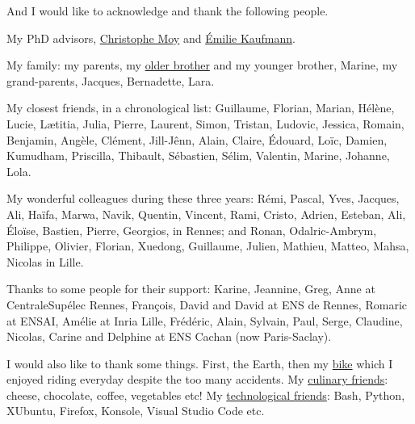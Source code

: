 
\begin{acknowledgements}


And I would like to acknowledge and thank the following people.

My PhD advisors, \href{https://moychristophe.wordpress.com/}{Christophe Moy} and \href{http://chercheurs.lille.inria.fr/ekaufman/research.html}{Émilie Kaufmann}.

My family: my parents, my \href{https://paris-sorbonne.academia.edu/FBesson}{older brother} and my younger brother, Marine, my grand-parents, Jacques, Bernadette, Lara.

My closest friends, in a chronological list: Guillaume, Florian, Marian, Hélène, Lucie, Lætitia, Julia, Pierre, Laurent, Simon, Tristan, Ludovic, Jessica, Romain, Benjamin, Angèle, Clément, Jill-Jênn, Alain, Claire, Édouard, Loïc, Damien, Kumudham, Priscilla, Thibault, Sébastien, Sélim, Valentin, Marine, Johanne, Lola.

My wonderful colleagues during these three years: Rémi, Pascal, Yves, Jacques, Ali, Haïfa, Marwa, Navik, Quentin, Vincent, Rami, Cristo, Adrien, Esteban, Ali, Éloïse, Bastien, Pierre, Georgios, in Rennes; and Ronan, Odalric-Ambrym, Philippe, Olivier, Florian, Xuedong, Guillaume, Julien, Mathieu, Matteo, Mahsa, Nicolas in Lille.

Thanks to some people for their support: Karine, Jeannine, Greg, Anne at CentraleSupélec Rennes, François, David and David at ENS de Rennes, Romaric at ENSAI, Amélie at Inria Lille, Frédéric, Alain, Sylvain, Paul, Serge, Claudine, Nicolas, Carine and Delphine at ENS Cachan (now Paris-Saclay).


I would also like to thank some things. First, the Earth, then my \href{https://perso.crans.org/besson/zero-dechet/}{bike} which I enjoyed riding everyday despite the too many accidents.
My \href{https://perso.crans.org/besson/cuisine/}{culinary friends}: cheese, chocolate, coffee, vegetables etc!
My \href{https://perso.crans.org/besson/}{technological friends}: Bash, Python, XUbuntu, Firefox, Konsole, Visual Studio Code etc.



\end{acknowledgements}
